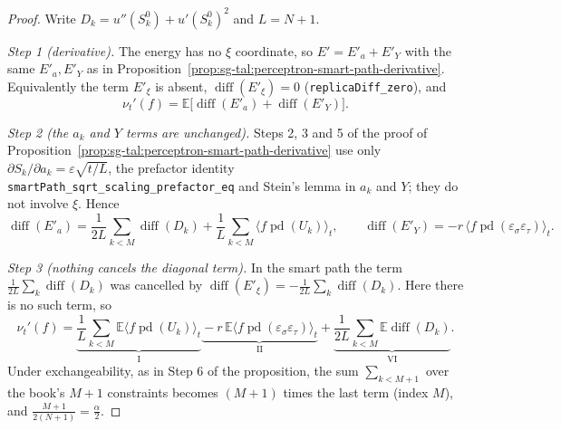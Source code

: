\begin{proof}
  \leanok
Write $D_k=u''(S^0_k)+u'(S^0_k)^2$ and $L=N+1$.

\emph{Step 1 (derivative).} The energy has no $\xi$ coordinate, so $E'=E'_a+E'_Y$ with the same $E'_a,E'_Y$ as in
Proposition~\ref{prop:sg-tal:perceptron-smart-path-derivative}. Equivalently the term $E'_\xi$ is absent,
$\operatorname{diff}(E'_\xi)=0$ (\texttt{replicaDiff\_zero}), and
\[
 \nu_t'(f)=\mathbb E\bigl[\operatorname{diff}(E'_a)+\operatorname{diff}(E'_Y)\bigr].
\]

\emph{Step 2 (the $a_k$ and $Y$ terms are unchanged).} Steps 2, 3 and 5 of the proof of
Proposition~\ref{prop:sg-tal:perceptron-smart-path-derivative} use only $\partial S_k/\partial a_k=\varepsilon\sqrt{t/L}$, the prefactor
identity \texttt{smartPath\_sqrt\_scaling\_prefactor\_eq} and Stein's lemma in $a_k$ and $Y$; they do not involve $\xi$. Hence
\[
 \operatorname{diff}(E'_a)=\frac1{2L}\sum_{k<M}\operatorname{diff}(D_k)+\frac1L\sum_{k<M}\bigl\langle f\operatorname{pd}(U_k)\bigr\rangle_t,
 \qquad
 \operatorname{diff}(E'_Y)=-r\,\bigl\langle f\operatorname{pd}(\varepsilon_\sigma\varepsilon_\tau)\bigr\rangle_t .
\]

\emph{Step 3 (nothing cancels the diagonal term).} In the smart path the term $\frac1{2L}\sum_k\operatorname{diff}(D_k)$ was cancelled by
$\operatorname{diff}(E'_\xi)=-\frac1{2L}\sum_k\operatorname{diff}(D_k)$. Here there is no such term, so
\[
 \nu_t'(f)=\underbrace{\frac1L\sum_{k<M}\mathbb E\bigl\langle f\operatorname{pd}(U_k)\bigr\rangle_t}_{\mathrm I}
 \underbrace{{}-r\,\mathbb E\bigl\langle f\operatorname{pd}(\varepsilon_\sigma\varepsilon_\tau)\bigr\rangle_t}_{\mathrm{II}}
 +\underbrace{\frac1{2L}\sum_{k<M}\mathbb E\operatorname{diff}(D_k)}_{\mathrm{VI}} .
\]
Under exchangeability, as in Step 6 of the proposition, the sum $\sum_{k<M+1}$ over the book's $M+1$ constraints becomes $(M+1)$ times the last term (index $M$), and
$\frac{M+1}{2(N+1)}=\frac\alpha2$.


\end{proof}
